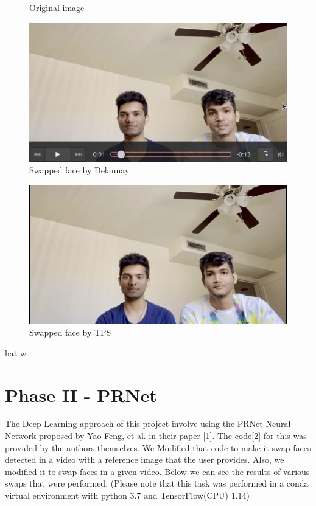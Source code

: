 \documentclass[conference]{IEEEtran}
\begin{document}
\begin{enumerate}
\begin{figure}[H]
\centering
\caption{Original image}
\end{figure}
\begin{figure}[H]
\includegraphics[scale=0.4]{dt2.png}
\centering
\caption{Swapped face by Delaunay}
\end{figure}
\begin{figure}[H]
\includegraphics[scale=0.4]{tps2swap.png}
\centering
\caption{Swapped face by TPS}
\end{figure}
\end{enumerate}hat w

\section{Phase II - PRNet}

The Deep Learning approach of this project involve using the PRNet Neural Network proposed by Yao Feng, et al. in their paper [1]. The code[2] for this was provided by the authors themselves. We Modified that code to make it swap faces detected in a video with a reference image that the user provides. Also, we modified it to swap faces in a given video. Below we can see the results of various swaps that were performed. (Please note that this task was performed in a conda virtual environment with python 3.7 and TensorFlow(CPU) 1.14)
\end{document}
